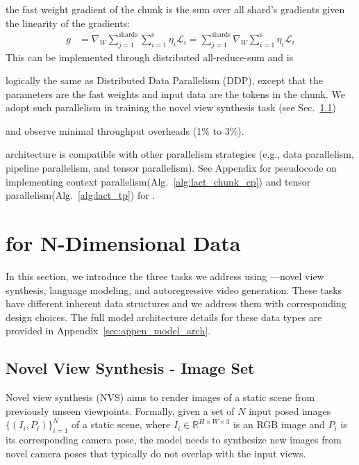 \documentclass{article}
\newcommand{\img}{I}
\begin{document}
the fast weight gradient of the chunk is the sum over all shard's gradients given the linearity of the gradients:
\begin{align}
g &=  \nabla_{W}  \sum_{j=1}^{\text{shards}} \sum_{i=1}^{\text{s}} \eta_i \mathcal{L}_i  = \sum_{j=1}^{\text{shards}} \nabla_{W}   \sum_{i=1}^{\text{s}} \eta_i \mathcal{L}_i
\label{eq:context_parallelism}
\end{align}
This can be implemented through distributed all-reduce-sum and is 

logically the same as Distributed Data Parallelism (DDP), except that the parameters are the fast weights and input data are the tokens in the chunk.
We adopt such parallelism in training the novel view synthesis task (see Sec.~\ref{sec:method-nvs}) 

and observe minimal throughput overheads (1\% to 3\%).

\methodname{} architecture is compatible with other parallelism strategies (e.g., data parallelism, pipeline parallelism, and tensor parallelism). See Appendix for pseudocode on implementing context parallelism(Alg.~\ref{alg:lact_chunk_cp}) and tensor parallelism(Alg.~\ref{alg:lact_tp}) for \methodname{}.

\section{\methodname{} for N-Dimensional Data} \label{sec:method}

In this section, we introduce the three tasks we address using \methodname{}---novel view synthesis, language modeling, and autoregressive video generation.
These tasks have different inherent data structures and we address them with corresponding design choices.
The full model architecture details for these data types are provided in Appendix~\ref{sec:appen_model_arch}.

\subsection{Novel View Synthesis - Image Set}
\label{sec:method-nvs}
Novel view synthesis (NVS)\cite{mcmillan2023plenoptic, levoy2023light} aims to render images of a static scene from previously unseen viewpoints. Formally, 
given a set of $N$ input posed images $\{ (  \img_i, P_i ) \}_{i=1}^N$ of a static scene, 
where $I_i \in \mathbb{R}^{H\times W \times 3}$ is an RGB image and $P_i$ is its corresponding camera pose,
the model needs to synthesize new images from novel camera poses that typically do not overlap with the input views. 
\end{document}
